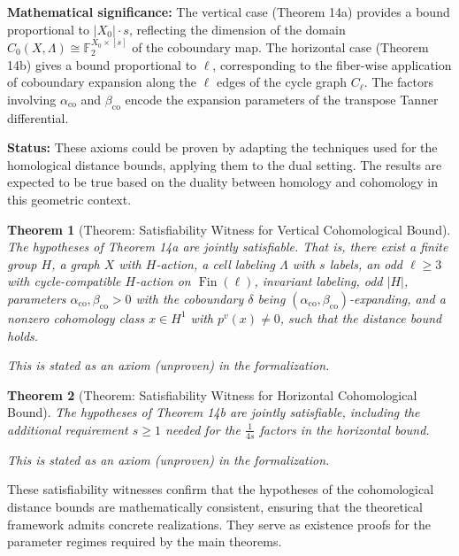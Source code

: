 \documentclass[11pt]{article}
\theoremstyle{plain}
\newtheorem*{theorem}{Theorem}
\theoremstyle{definition}
\theoremstyle{remark}
\begin{document}
\textbf{Mathematical significance:} The vertical case (Theorem 14a) provides a bound proportional to $|X_0| \cdot s$, reflecting the dimension of the domain $C_0(X,\Lambda) \cong \mathbb{F}_2^{X_0 \times [s]}$ of the coboundary map. The horizontal case (Theorem 14b) gives a bound proportional to $\ell$, corresponding to the fiber-wise application of coboundary expansion along the $\ell$ edges of the cycle graph $C_\ell$. The factors involving $\alpha_{\mathrm{co}}$ and $\beta_{\mathrm{co}}$ encode the expansion parameters of the transpose Tanner differential.

\textbf{Status:} These axioms could be proven by adapting the techniques used for the homological distance bounds, applying them to the dual setting. The results are expected to be true based on the duality between homology and cohomology in this geometric context.

\begin{theorem}[Theorem: Satisfiability Witness for Vertical Cohomological Bound]
The hypotheses of Theorem 14a are jointly satisfiable. That is, there exist a finite group $H$, a graph $X$ with $H$-action, a cell labeling $\Lambda$ with $s$ labels, an odd $\ell \geq 3$ with cycle-compatible $H$-action on $\operatorname{Fin}(\ell)$, invariant labeling, odd $|H|$, parameters $\alpha_{\mathrm{co}}, \beta_{\mathrm{co}} > 0$ with the coboundary $\delta$ being $(\alpha_{\mathrm{co}}, \beta_{\mathrm{co}})$-expanding, and a nonzero cohomology class $x \in H^1$ with $p^v(x) \neq 0$, such that the distance bound holds.

\textit{This is stated as an axiom (unproven) in the formalization.}
\end{theorem}

\begin{theorem}[Theorem: Satisfiability Witness for Horizontal Cohomological Bound]
The hypotheses of Theorem 14b are jointly satisfiable, including the additional requirement $s \geq 1$ needed for the $\frac{1}{4s}$ factors in the horizontal bound.

\textit{This is stated as an axiom (unproven) in the formalization.}
\end{theorem}

These satisfiability witnesses confirm that the hypotheses of the cohomological distance bounds are mathematically consistent, ensuring that the theoretical framework admits concrete realizations. They serve as existence proofs for the parameter regimes required by the main theorems.

\vspace{1em}
\end{document}
